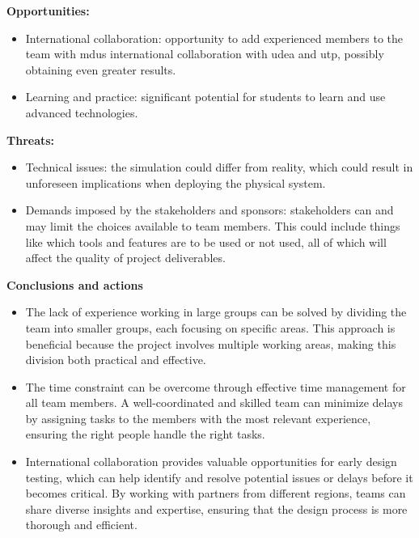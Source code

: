 \textbf{Opportunities:}
\begin{itemize}
    \item International collaboration: opportunity to add experienced members to the team with \ac{mdu}s international collaboration with \ac{udea} and \ac{utp}, possibly obtaining even greater results. 
    \item Learning and practice: significant potential for students to learn and use advanced technologies. 
\end{itemize}

\textbf{Threats:}
\begin{itemize}
    \item Technical issues: the simulation could differ from reality, which could result in unforeseen implications when deploying the physical system. 
    \item Demands imposed by the stakeholders and sponsors: stakeholders can and may limit the choices available to team members. This could include things like which tools and features are to be used or not used, all of which will affect the quality of project deliverables. 
\end{itemize}

\textbf{Conclusions and actions}
\begin{itemize}
   \item  The lack of experience working in large groups can be solved by dividing the team into smaller groups, each focusing on specific areas. This approach is beneficial because the project involves multiple working areas, making this division both practical and effective.
   \item The time constraint can be overcome through effective time management for all team members. A well-coordinated and skilled team can minimize delays by assigning tasks to the members with the most relevant experience, ensuring the right people handle the right tasks.
   \item International collaboration provides valuable opportunities for early design testing, which can help identify and resolve potential issues or delays before it becomes critical. By working with partners from different regions, teams can share diverse insights and expertise, ensuring that the design process is more thorough and efficient. 
\end{itemize}

